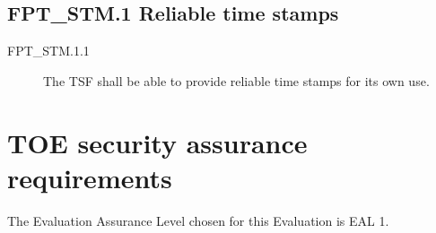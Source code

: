 \documentclass[12pt,english]{scrbook}
\begin{document}



\subsection{FPT{\_}STM.1 Reliable time stamps}
\begin{description}
\item[FPT{\_}STM.1.1]

The TSF shall be able to provide reliable time stamps for its own use.

\end{description}





\section{TOE security assurance requirements}

The Evaluation Assurance Level chosen for this Evaluation is EAL 1.
\end{document}
